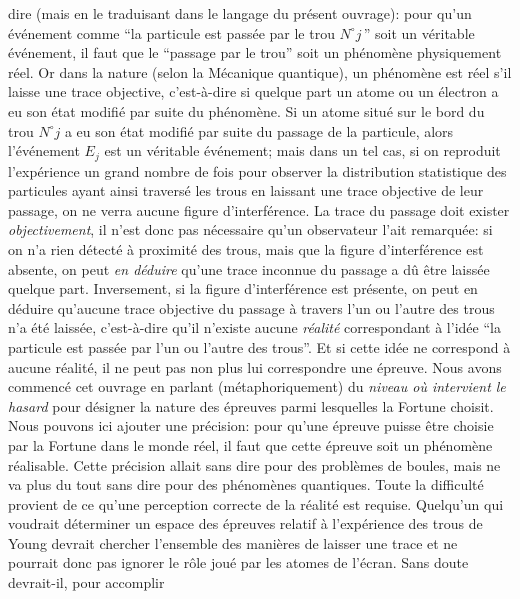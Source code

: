 dire (mais en le traduisant dans le langage du pr\'esent ouvrage): pour
qu'un \'ev\'enement comme ``la parti\-cule est pass\'ee par le trou $N^\circ 
j\,$'' soit un v\'eritable \'ev\'enement, il faut que le ``passage par le
trou'' soit un ph\'enom\`ene physiquement r\'eel. Or dans la nature (selon la
M\'ecanique quantique),  un ph\'enom\`ene est r\'eel s'il laisse une trace
objective, c'est-\`a-dire si quelque part un atome ou un \'electron a eu 
son \'etat modifi\'e par suite du ph\'enom\`ene. Si un atome situ\'e sur 
le bord du trou $N^\circ  j$ a eu son \'etat modifi\'e par suite du passage 
de la particule, alors l'\'ev\'enement $E_j$ est un  v\'eritable 
\'ev\'enement; mais dans un tel cas, si  on reproduit l'exp\'erience un 
grand  nombre de fois pour observer la distribution statistique des 
particules ayant ainsi travers\'e les trous en laissant une trace 
objective de leur passage, on ne verra aucune figure d'interf\'erence. 
La trace du passage doit exister {\it objectivement},  il n'est donc pas 
n\'ecessaire qu'un observateur l'ait remarqu\'ee: si on n'a rien 
d\'etect\'e \`a proximit\'e des trous, mais que la figure 
d'interf\'erence est absente, on peut {\it en d\'eduire} qu'une trace 
inconnue du passage a d\^u \^etre laiss\'ee quelque part.  Inversement,  
si la figure d'interf\'erence est pr\'esente, on peut en d\'eduire 
qu'aucune  trace objective du passage \`a travers l'un ou l'autre des 
trous n'a \'et\'e laiss\'ee, c'est-\`a-dire qu'il n'existe aucune {\it 
r\'ealit\'e} correspondant  \`a l'id\'ee ``la par\-ti\-cule est pass\'ee par 
l'un ou l'autre des trous''. Et si cette id\'ee ne correspond \`a aucune 
r\'ealit\'e, il ne peut pas non plus lui  correspondre une \'epreuve. Nous 
avons commenc\'e cet ouvrage en parlant (m\'etaphoriquement) du {\it 
niveau o\`u intervient le hasard} pour  d\'esigner la nature des 
\'epreuves parmi lesquelles la Fortune choisit. Nous pouvons ici ajouter 
une pr\'ecision:  pour qu'une \'epreuve puisse \^etre choisie par la 
Fortune  dans le monde  r\'eel, il faut que cette \'epreuve soit un 
ph\'enom\`ene r\'ealisable. Cette pr\'ecision allait sans dire pour des 
probl\`emes de boules, mais ne va plus du tout sans dire pour des 
ph\'enom\`enes quantiques. Toute la difficult\'e provient de ce qu'une 
perception  correcte de la r\'ealit\'e est re\-qui\-se. Quelqu'un qui 
voudrait d\'eterminer  un espace  des \'epreuves relatif \`a 
l'exp\'erience des  trous de Young  devrait chercher l'ensemble des 
mani\`eres de laisser  une trace et ne  pourrait donc pas ignorer le r\^ole 
jou\'e par les atomes  de l'\'ecran. Sans doute devrait-il, pour accomplir 
